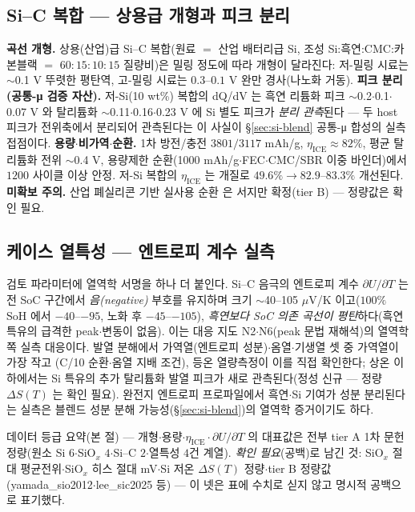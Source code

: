 \subsection{Si--C 복합 --- 상용급 개형과 피크 분리}\label{ssec:si-sic}
\textbf{곡선 개형.} 상용(산업)급 Si--C 복합(원료 $=$ 산업 배터리급 Si, 조성 Si:흑연:CMC:카본블랙 $=$
$60{:}15{:}10{:}15$ 질량비)은 밀링 정도에 따라 개형이 달라진다: 저-밀링 시료는 $\sim$0.1 V 뚜렷한 평탄역, 고-밀링
시료는 $0.3$--$0.1$ V 완만 경사(나노화 거동)\cite{andersen_sic2019}. \textbf{피크 분리(공통-μ 검증
자산).} 저-Si(10 wt\%) 복합의 dQ/dV 는 흑연 리튬화 피크 $\sim$0.2$\cdot$0.1$\cdot$0.07 V 와 탈리튬화
$\sim$0.11$\cdot$0.16$\cdot$0.23 V 에 Si 별도 피크가 \emph{분리 관측}된다\cite{naboka_sic2021} --- 두 host
피크가 전위축에서 분리되어 관측된다는 이 사실이 \S\ref{sec:si-blend} 공통-μ 합성의 실측 접점이다.
\textbf{용량$\cdot$비가역$\cdot$순환.} 1차 방전/충전 $3801/3117$ mAh/g, $\eta_\mathrm{ICE}\approx82\%$,
평균 탈리튬화 전위 $\sim$0.4 V, 용량제한 순환(1000 mAh/g$\cdot$FEC$\cdot$CMC/SBR 이중 바인더)에서 $1200$
사이클 이상 안정\cite{andersen_sic2019}. 저-Si 복합의 $\eta_\mathrm{ICE}$ 는 개질로 $49.6\%\to82.9$--$83.3\%$
개선된다\cite{naboka_sic2021}. \textbf{미확보 주의.} 산업 폐실리콘 기반 실사용 순환\cite{lee_sic2025} 은
서지만 확정(tier B) --- 정량값은 확인 필요.

\subsection{케이스 열특성 --- 엔트로피 계수 실측}\label{ssec:si-thermal}
검토 파라미터에 열역학 서명을 하나 더 붙인다. Si--C 음극의 엔트로피 계수 $\partial U/\partial T$ 는 전 SoC
구간에서 \emph{음(negative)} 부호를 유지하며 크기 $\sim$40--105 $\mu$V/K 이고($100\%$ SoH 에서
$-40$--$-95$, 노화 후 $-45$--$-105$), \emph{흑연보다 SoC 의존 곡선이 평탄}하다(흑연 특유의 급격한
peak$\cdot$변동이 없음)\cite{bohm_entropy2024}. 이는 대응 지도 N2$\cdot$N6(peak 문법 재해석)의 열역학
쪽 실측 대응이다. 발열 분해에서 가역열(엔트로피 성분)$\cdot$옴열$\cdot$기생열 셋 중 가역열이 가장 작고
(C/10 순환$\cdot$옴열 지배 조건), 등온 열량측정이
이를 직접 확인한다\cite{arnot_calorimetry2021}; 상온 이하에서는 Si 특유의 추가 탈리튬화 발열 피크가 새로
관측된다\cite{bohm_thermal2025}(정성 신규 --- 정량 $\Delta S(T)$ 는 확인 필요). 완전지 엔트로피
프로파일에서 흑연$\cdot$Si 기여가 성분 분리된다는 실측\cite{wojtala_entropy2022}은 블렌드 성분 분해
가능성(\S\ref{sec:si-blend})의 열역학 증거이기도 하다.
\begin{srcbox}
데이터 등급 요약(본 절) --- 개형$\cdot$용량$\cdot\eta_\mathrm{ICE}\cdot\partial U/\partial T$ 의 대표값은
전부 tier A 1차 문헌 정량(원소 Si $6$$\cdot$SiO$_x$ $4$$\cdot$Si--C $2$$\cdot$열특성 $4$건 계열). \emph{확인
필요}(공백)로 남긴 것: SiO$_x$ 절대 평균전위$\cdot$SiO$_x$ 히스 절대 mV$\cdot$Si 저온 $\Delta S(T)$
정량$\cdot$tier B 정량값(yamada\_sio2012$\cdot$lee\_sic2025 등) --- 이 넷은 표에 수치로 싣지 않고 명시적
공백으로 표기했다.
\end{srcbox}

